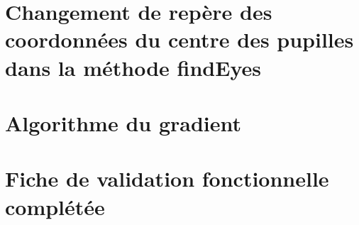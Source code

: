 \documentclass[12pt]{report} %
\begin{document}
\chapter{Changement de repère des coordonnées du centre des pupilles dans la méthode findEyes}
\label{A6}


\chapter{Algorithme du gradient}
\label{A7}


\chapter{Fiche de validation fonctionnelle complétée}
\label{AFV}


\newpage
{}


\nocite{*}


\end{document}
